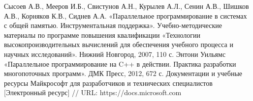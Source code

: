 \documentclass{report}
\begin{document}
\newpage


\begin{thebibliography}{1}
 Сысоев А.В., Мееров И.Б., Свистунов А.Н., Курылев А.Л., Сенин А.В., Шишков А.В., Корняков К.В., Сиднев А.А. «Параллельное программирование в системах с общей памятью. Инструментальная поддержка». Учебно-методические материалы по программе повышения квалификации «Технологии высокопроизводительных вычислений для обеспечения учебного процесса и научных исследований». Нижний Новгород, 2007, 110 с. 
 Энтони Уильямс «Параллельное программирование на C++ в действии. Практика разработки многопоточных программ». ДМК Пресс, 2012, 672 с. 
 Документации и учебные ресурсы Майкрософт для разработчиков и технических специалистов [Электронный ресурс] // URL: https://docs.microsoft.com
\end{thebibliography}
\newpage
\end{document}
